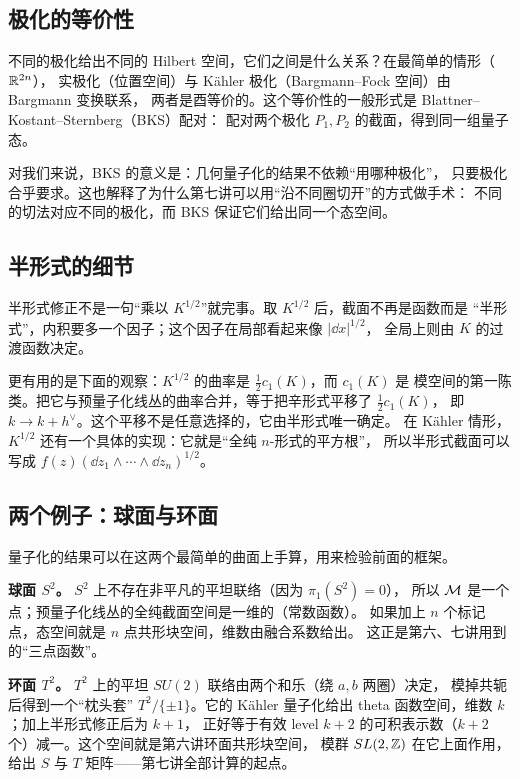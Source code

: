 \subsection{极化的等价性}

不同的极化给出不同的 Hilbert 空间，它们之间是什么关系？在最简单的情形（$\mathbb{R}^{2n}$），
实极化（位置空间）与 Kähler 极化（Bargmann–Fock 空间）由 Bargmann 变换联系，
两者是酉等价的。这个等价性的一般形式是 Blattner–Kostant–Sternberg（BKS）配对：
配对两个极化 $P_1,P_2$ 的截面，得到同一组量子态。

对我们来说，BKS 的意义是：几何量子化的结果不依赖“用哪种极化”，
只要极化合乎要求。这也解释了为什么第七讲可以用“沿不同圈切开”的方式做手术：
不同的切法对应不同的极化，而 BKS 保证它们给出同一个态空间。

\subsection{半形式的细节}

半形式修正不是一句“乘以 $K^{1/2}$”就完事。取 $K^{1/2}$ 后，截面不再是函数而是
“半形式”，内积要多一个因子；这个因子在局部看起来像 $|\dd x|^{1/2}$，
全局上则由 $K$ 的过渡函数决定。

更有用的是下面的观察：$K^{1/2}$ 的曲率是 $\frac12 c_1(K)$，而 $c_1(K)$ 是
模空间的第一陈类。把它与预量子化线丛的曲率合并，等于把辛形式平移了 $\frac12 c_1(K)$，
即 $k\to k+h^\vee$。这个平移不是任意选择的，它由半形式唯一确定。
在 Kähler 情形，$K^{1/2}$ 还有一个具体的实现：它就是“全纯 $n$-形式的平方根”，
所以半形式截面可以写成 $f(z)(\dd z_1\wedge\cdots\wedge\dd z_n)^{1/2}$。

\subsection{两个例子：球面与环面}

量子化的结果可以在这两个最简单的曲面上手算，用来检验前面的框架。

\textbf{球面 $S^2$。} $S^2$ 上不存在非平凡的平坦联络（因为 $\pi_1(S^2)=0$），
所以 $\mathcal{M}$ 是一个点；预量子化线丛的全纯截面空间是一维的（常数函数）。
如果加上 $n$ 个标记点，态空间就是 $n$ 点共形块空间，维数由融合系数给出。
这正是第六、七讲用到的“三点函数”。

\textbf{环面 $T^2$。} $T^2$ 上的平坦 $SU(2)$ 联络由两个和乐（绕 $a,b$ 两圈）决定，
模掉共轭后得到一个“枕头套” $T^2/\{\pm1\}$。它的 Kähler 量子化给出 theta 函数空间，维数 $k$；加上半形式修正后为 $k+1$，
正好等于有效 level $k+2$ 的可积表示数（$k+2$ 个）减一。这个空间就是第六讲环面共形块空间，
模群 $SL(2,\mathbb{Z})$ 在它上面作用，给出 $S$ 与 $T$ 矩阵——第七讲全部计算的起点。

